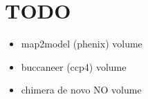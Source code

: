 \section{TODO}
\begin{itemize}
 \item map2model (phenix) volume
 \item buccaneer (ccp4) volume
 \item chimera de novo NO volume
 
\end{itemize}
